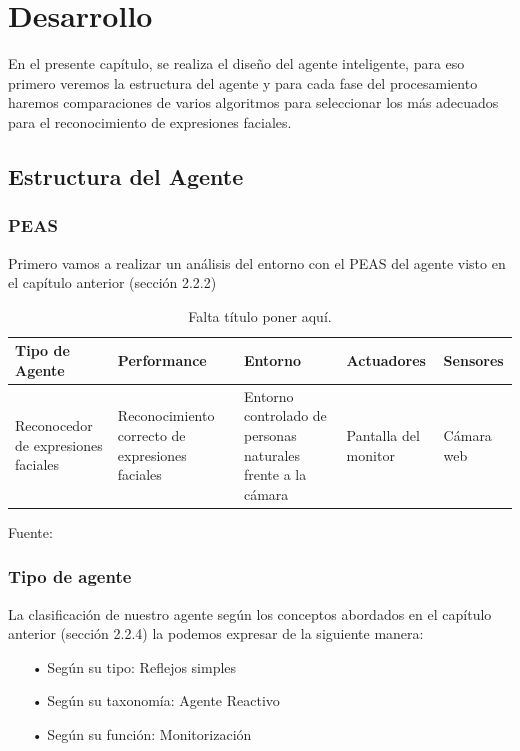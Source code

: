 \chapter{Desarrollo}

En el presente capítulo, se realiza  el diseño del agente inteligente, para eso primero veremos la estructura del agente y para cada fase del procesamiento haremos comparaciones de varios algoritmos para seleccionar los más adecuados para el reconocimiento de expresiones faciales.

\section{Estructura del Agente}
\subsection{PEAS}
Primero vamos a realizar un análisis del entorno con el PEAS del agente visto en el capítulo anterior (sección 2.2.2) 

\begin{table}[ht!]
\centering
\caption{Falta título poner aquí.} \vskip 0.1cm
\begin{tabular}{|p{2.7cm} |p{3cm} |p{3.8cm} |p{2cm} |p{2.1cm}|}  \hline 
\bf Tipo de Agente & \bf Performance & \bf Entorno & \bf Actuadores & \bf Sensores \\ \hline 
Reconocedor de expresiones faciales & Reconocimiento correcto de expresiones faciales & Entorno controlado de personas naturales frente a la cámara & Pantalla del monitor & Cámara web \\ \hline
\end{tabular} 
\begin{center}
{\small{Fuente: \cite{FALTA}}}
\end{center}
\end{table}

\subsection{Tipo de agente}
La clasificación de nuestro agente según los conceptos abordados en el capítulo anterior (sección 2.2.4)  la podemos expresar de la siguiente manera:

\begin{itemize}
\item[•] Según su tipo: Reflejos simples
\item[•] Según su taxonomía: Agente Reactivo
\item[•] Según su función: Monitorización
\end{itemize}

